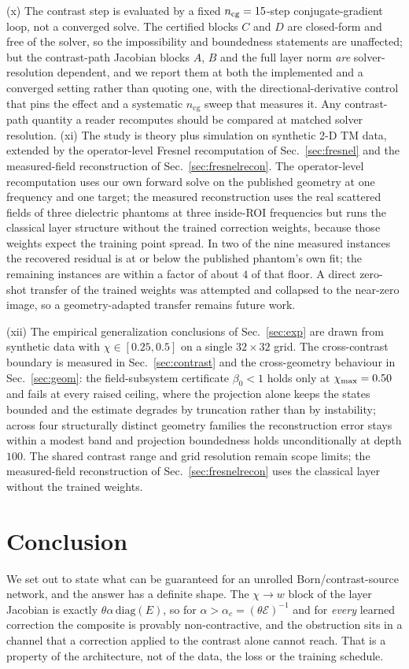 \documentclass[journal,cmes,article,submit,moreauthors,pdftex]{Definitions/tsp}
\newcommand{\numv}[1]{#1}
\begin{document}
(x) The contrast step is evaluated by a fixed $n_{\mathrm{cg}}=\numv{\NumNCg}$-step conjugate-gradient
loop, not a converged solve. The certified blocks $C$ and $D$ are closed-form and free of the solver,
so the impossibility and boundedness statements are unaffected; but the contrast-path Jacobian blocks
$A$, $B$ and the full layer norm \emph{are} solver-resolution dependent, and we report them at both
the implemented and a converged setting rather than quoting one, with the
directional-derivative control that pins the effect and a systematic $n_{\mathrm{cg}}$ sweep that
measures it. Any contrast-path quantity a reader recomputes should be
compared at matched solver resolution.
(xi) The study is theory plus simulation on synthetic 2-D TM data, extended by the
operator-level Fresnel recomputation of Sec.~\ref{sec:fresnel} and the measured-field
reconstruction of Sec.~\ref{sec:fresnelrecon}. The operator-level recomputation uses our
own forward solve on the published geometry at one frequency and one target; the
measured reconstruction uses the real scattered fields of three dielectric phantoms at
three inside-ROI frequencies but runs the classical layer structure without the trained
correction weights, because those weights expect the training point spread. In two of the
nine measured instances the recovered residual is at or below the published phantom's own
fit; the remaining instances are within a factor of about $4$ of that floor. A direct
zero-shot transfer of the trained weights was attempted and collapsed to the near-zero
image, so a geometry-adapted transfer remains future work.

(xii) The empirical generalization conclusions of Sec.~\ref{sec:exp} are drawn from synthetic data with $\chi\in[0.25,0.5]$ on a single $32\times32$ grid. The cross-contrast boundary is measured in Sec.~\ref{sec:contrast} and the cross-geometry behaviour in Sec.~\ref{sec:geom}: the field-subsystem certificate $\beta_0<1$ holds only at $\chi_{\max}=\numv{\NumMaxChiBox}$ and fails at every raised ceiling, where the projection alone keeps the states bounded and the estimate degrades by truncation rather than by instability; across four structurally distinct geometry families the reconstruction error stays within a modest band and projection boundedness holds unconditionally at depth $100$. The shared contrast range and grid resolution remain scope limits; the measured-field
reconstruction of Sec.~\ref{sec:fresnelrecon} uses the classical layer without the trained
weights.

\section{Conclusion}
We set out to state what can be guaranteed for an unrolled Born/contrast-source network, and the
answer has a definite shape. The $\chi\!\to\!w$ block of the layer Jacobian is exactly
$\theta\alpha\,\mathrm{diag}(E)$, so for $\alpha>\alpha_c=(\theta\mathcal{E})^{-1}$ and for
\emph{every} learned correction the composite is provably non-contractive, and the obstruction sits
in a channel that a correction applied to the contrast alone cannot reach. That is a property of the
architecture, not of the data, the loss or the training schedule.
\end{document}
